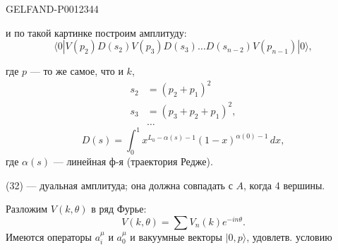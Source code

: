 \begin{GelfandAdjacentEvidence}{GELFAND-P001234}{4}


и по такой картинке построим амплитуду:
\begin{equation*}
\langle0|V(p_2)D(s_2)V(p_3)D(s_3)\ldots D(s_{n-2})V(p_{n-1})|0\rangle,
\tag{32}
\end{equation*}
\end{GelfandAdjacentEvidence}

где \(p\) --- то же самое, что и \(k\),
\begin{equation*}
\begin{aligned}
s_2&=(p_2+p_1)^2\\
s_3&=(p_3+p_2+p_1)^2,\\
&\ldots
\end{aligned}\tag{33}
\end{equation*}
\begin{equation*}
D(s)=\int_0^1 x^{L_0-\alpha(s)-1}(1-x)^{\alpha(0)-1}\,dx,\tag{34}
\end{equation*}
где \(\alpha(s)\) --- линейная ф-я (траектория Редже).

(32) --- дуальная амплитуда; она должна совпадать с \(A\), когда 4 вершины.

Разложим \(V(k,\theta)\) в ряд Фурье:
\begin{equation*}
V(k,\theta)=\sum V_n(k)e^{-in\theta}.\tag{35}
\end{equation*}
Имеются операторы \(a_i^\mu\) и \(a_0^\mu\) и вакуумные векторы
\(|0,p\rangle\), удовлетв. условию


